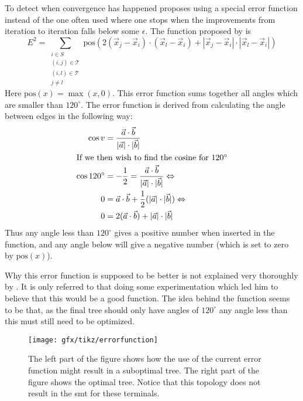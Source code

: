 To detect when convergence has happened \citeauthor{smith1992} proposes using a special
error function instead of the one often used where one stops when the
improvements from iteration to iteration falls below some $\epsilon$. The
function proposed by \citeauthor{smith1992} is
%
\begin{equation}
  E^2 = \sum_{
    \begin{array}{c} i \in S \\ (i,j) \in \mathcal{T} \\ (i,l) \in \mathcal{T} \\ j \ne l
    \end{array}} \text{pos} (2 (\vec x_j - \vec x_i) \cdot (\vec x_l - \vec x_i)
+ | \vec x_j - \vec x_i | \cdot | \vec x_l - \vec x_i |)
\end{equation}
%
Here $\text{pos}(x) = \max(x, 0)$. This error function sums together all angles which
are smaller than $120^{\circ}$. The error function is derived from calculating
the angle between edges in the following way:
%
\begin{align}
  \cos v & = \frac{\vec a \cdot \vec b}
    {|\vec a| \cdot |\vec b|}                 \\
  \intertext{If we then wish to find the cosine for $120^{\circ}$}
  \cos 120^{\circ}
         & = -\frac{1}{2} = \frac{\vec a \cdot \vec b}
    {|\vec a| \cdot |\vec b|} \Leftrightarrow \\
  0      & = \vec a \cdot \vec b + \frac{1}{2}
    (|\vec a| \cdot |\vec b|) \Leftrightarrow \\
  0      & = 2 (\vec a \cdot \vec b) + |\vec a| \cdot |\vec b|
\end{align}
%
Thus any angle less than $120^{\circ}$ gives a positive number when inserted in
the function, and any angle below will give a negative number (which is set to
zero by $\text{pos}(x)$).

Why this error function is supposed to be better is not explained very
thoroughly by \citeauthor{smith1992}. It is only referred to that doing some
experimentation which led him to believe that this would be a good function. The
idea behind the function seems to be that, as the final tree should only have
angles of $120^{\circ}$ any angle less than this must still need to be
optimized.

\begin{figure}[htbp]
  \centering
  \texttt{[image: gfx/tikz/errorfunction]}
  \caption[Possible problem with the error function, part 1]{The left part of the figure
    shows how the use of the current error function might result in a suboptimal
    tree. The right part of the figure shows the optimal tree. Notice that
    this topology does not result in the \ac{smt} for these
    terminals.\label{fig:error-function}}
\end{figure}

